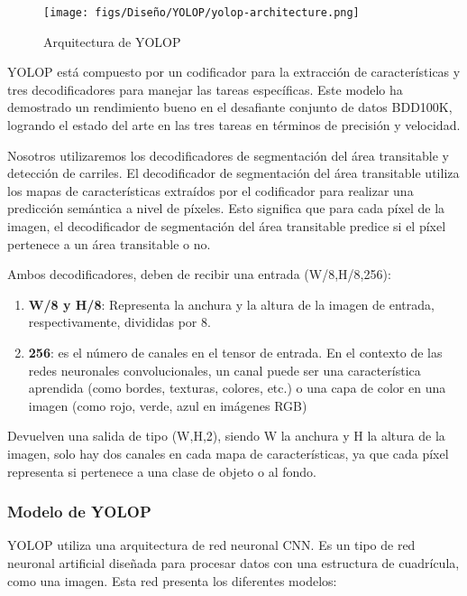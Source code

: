 \begin{figure} [H]
  \begin{center}
    \texttt{[image: figs/Diseño/YOLOP/yolop-architecture.png]}
  \end{center}
  \caption{Arquitectura de YOLOP}
  \label{fig:Arq_YOLOP}
  \vspace{-1.5em}
\end{figure}

YOLOP está compuesto por un codificador para la extracción de características y tres decodificadores para manejar las tareas específicas. Este modelo ha demostrado un rendimiento 
bueno en el desafiante conjunto de datos BDD100K\cite{BDD100K}, logrando el estado del arte en las tres tareas en términos de precisión y velocidad. 

Nosotros utilizaremos los decodificadores de segmentación del área transitable 
y detección de carriles. El decodificador de segmentación del área transitable utiliza los mapas de características
extraídos por el codificador para realizar una predicción semántica a nivel de píxeles. Esto significa que 
para cada píxel de la imagen, el decodificador de segmentación del área transitable predice si el píxel 
pertenece a un área transitable o no. 

Ambos decodificadores, deben de recibir una entrada (W/8,H/8,256):  
\begin{enumerate}
  \item \textbf{W/8 y H/8}: Representa la anchura y la altura de la imagen de entrada, respectivamente, divididas por 8.
  \item \textbf{256}: es el número de 
  canales en el tensor de entrada. En el contexto de las redes neuronales convolucionales, 
  un canal puede ser una característica aprendida (como bordes, texturas, colores, etc.) o una capa de color en una imagen (como rojo, verde, azul en imágenes RGB)
\end{enumerate}

Devuelven una salida de tipo (W,H,2), siendo W la anchura y H la altura de la imagen, solo hay dos canales en cada mapa de características, ya que cada píxel 
representa si pertenece a una clase de objeto o al fondo. 

\subsubsection{Modelo de YOLOP}
\label{sec:Modelo_YOLOP}

YOLOP utiliza una arquitectura de red neuronal CNN. Es un tipo de red neuronal artificial diseñada para procesar datos con una
estructura de cuadrícula, como una imagen. Esta red presenta los diferentes modelos:

